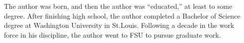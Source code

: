 \documentclass[11pt,expanded,copyright]{fsuthesis}
\begin{document}


%


\begin{biosketch}
The author was born, and then the author was ``educated,'' at least to
some degree.  After finishing high school, the author
completed a Bachelor of Science degree at Washington University in St.Louis.
Following a decade in the work force in his discipline, the author
went to FSU to pursue graduate work.
\end{biosketch}

\end{document}
